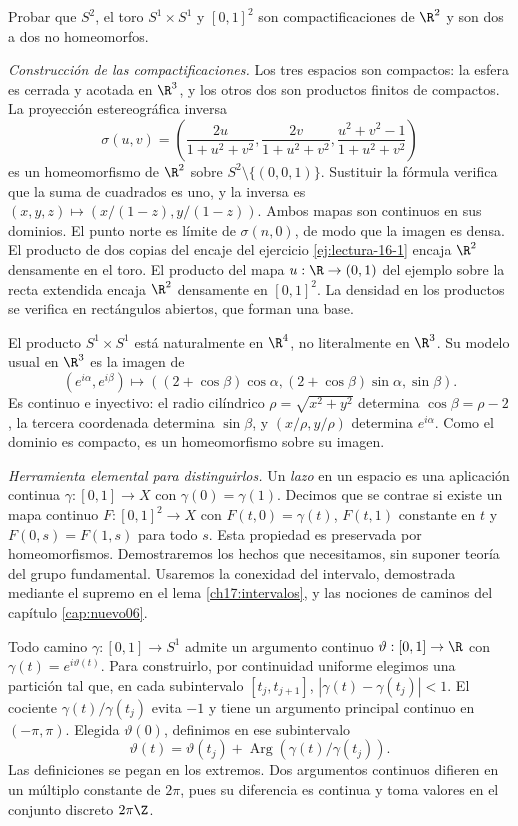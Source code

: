 \begin{ejercicio}\label{ej:lectura-16-2}
Probar que $S^2$, el toro $S^1\times S^1$ y $[0,1]^2$ son compactificaciones de $\R^2$ y son dos a dos no homeomorfos.
\end{ejercicio}
\begin{solucion}
\emph{Construcción de las compactificaciones.} Los tres espacios son compactos: la esfera es cerrada y acotada en $\R^3$, y los otros dos son productos finitos de compactos. La proyección estereográfica inversa
\[
\sigma(u,v)=\left(\frac{2u}{1+u^2+v^2},
\frac{2v}{1+u^2+v^2},\frac{u^2+v^2-1}{1+u^2+v^2}\right)
\]
es un homeomorfismo de $\R^2$ sobre $S^2\setminus\{(0,0,1)\}$. Sustituir la fórmula verifica que la suma de cuadrados es uno, y la inversa es $(x,y,z)\mapsto(x/(1-z),y/(1-z))$. Ambos mapas son continuos en sus dominios. El punto norte es límite de $\sigma(n,0)$, de modo que la imagen es densa. El producto de dos copias del encaje del ejercicio \ref{ej:lectura-16-1} encaja $\R^2$ densamente en el toro. El producto del mapa $u:\R\to(0,1)$ del ejemplo sobre la recta extendida encaja $\R^2$ densamente en $[0,1]^2$. La densidad en los productos se verifica en rectángulos abiertos, que forman una base.

El producto $S^1\times S^1$ está naturalmente en $\R^4$, no literalmente en $\R^3$. Su modelo usual en $\R^3$ es la imagen de
\[
(e^{i\alpha},e^{i\beta})\longmapsto
((2+\cos\beta)\cos\alpha,(2+\cos\beta)\sin\alpha,\sin\beta).
\]
Es continuo e inyectivo: el radio cilíndrico $\rho=\sqrt{x^2+y^2}$ determina $\cos\beta=\rho-2$, la tercera coordenada determina $\sin\beta$, y $(x/\rho,y/\rho)$ determina $e^{i\alpha}$. Como el dominio es compacto, es un homeomorfismo sobre su imagen.

\emph{Herramienta elemental para distinguirlos.} Un \emph{lazo} en un espacio es una aplicación continua $\gamma:[0,1]\to X$ con $\gamma(0)=\gamma(1)$. Decimos que se contrae si existe un mapa continuo $F:[0,1]^2\to X$ con $F(t,0)=\gamma(t)$, $F(t,1)$ constante en $t$ y $F(0,s)=F(1,s)$ para todo $s$. Esta propiedad es preservada por homeomorfismos. Demostraremos los hechos que necesitamos, sin suponer teoría del grupo fundamental. Usaremos la conexidad del intervalo, demostrada mediante el supremo en el lema \ref{ch17:intervalos}, y las nociones de caminos del capítulo \ref{cap:nuevo06}.

Todo camino $\gamma:[0,1]\to S^1$ admite un argumento continuo $\vartheta:[0,1]\to\R$ con $\gamma(t)=e^{i\vartheta(t)}$. Para construirlo, por continuidad uniforme elegimos una partición tal que, en cada subintervalo $[t_j,t_{j+1}]$, $|\gamma(t)-\gamma(t_j)|<1$. El cociente $\gamma(t)/\gamma(t_j)$ evita $-1$ y tiene un argumento principal continuo en $(-\pi,\pi)$. Elegida $\vartheta(0)$, definimos en ese subintervalo
\[
\vartheta(t)=\vartheta(t_j)+\operatorname{Arg}(\gamma(t)/\gamma(t_j)).
\]
Las definiciones se pegan en los extremos. Dos argumentos continuos difieren en un múltiplo constante de $2\pi$, pues su diferencia es continua y toma valores en el conjunto discreto $2\pi\Z$.


\end{solucion}
